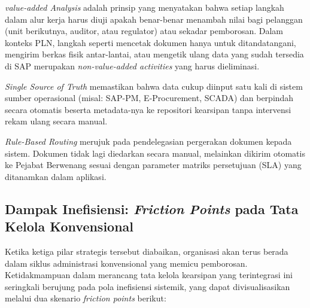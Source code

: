 \documentclass[12pt,a4paper]{report}
\begin{document}
\textit{\textit{value-added} Analysis} adalah prinsip yang menyatakan bahwa setiap langkah dalam alur kerja harus diuji apakah benar-benar menambah nilai bagi pelanggan (unit berikutnya, auditor, atau regulator) atau sekadar pemborosan. Dalam konteks PLN, langkah seperti mencetak dokumen hanya untuk ditandatangani, mengirim berkas fisik antar-lantai, atau mengetik ulang data yang sudah tersedia di SAP merupakan \textit{\textit{non-\textit{value-added}} activities} yang harus dieliminasi.

\textit{Single Source of Truth} memastikan bahwa data cukup diinput satu kali di sistem sumber operasional (misal: SAP-PM, E-Procurement, SCADA) dan berpindah secara otomatis beserta metadata-nya ke repositori kearsipan tanpa intervensi rekam ulang secara manual.

\textit{Rule-Based Routing} merujuk pada pendelegasian pergerakan dokumen kepada sistem. Dokumen tidak lagi diedarkan secara manual, melainkan dikirim otomatis ke Pejabat Berwenang sesuai dengan parameter matriks persetujuan (SLA) yang ditanamkan dalam aplikasi.

\subsection*{Dampak Inefisiensi: \textit{Friction Points} pada Tata Kelola Konvensional}

Ketika ketiga pilar strategis tersebut diabaikan, organisasi akan terus berada dalam siklus administrasi konvensional yang memicu pemborosan. Ketidakmampuan dalam merancang tata kelola kearsipan yang terintegrasi ini seringkali berujung pada pola inefisiensi sistemik, yang dapat divisualisasikan melalui dua skenario \textit{friction points} berikut:
\end{document}
